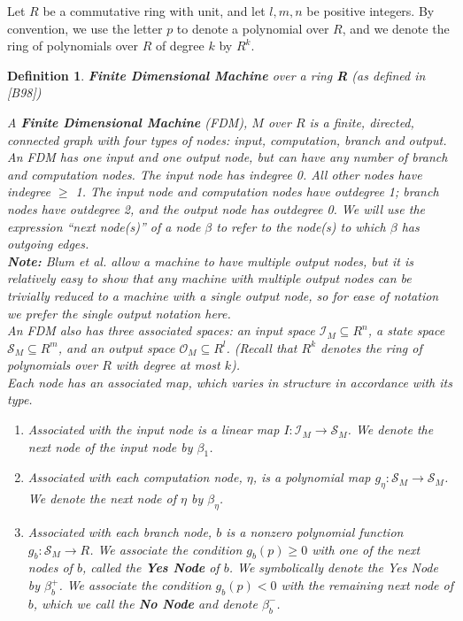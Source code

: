 \documentclass[twoside]{article}
\newcommand{\functype}[3]{$#1:#2 \rightarrow #3$}
\newcommand{\inspace}[0]{\mathcal{I}}
\newcommand{\outspace}[0]{\mathcal{O}}
\newcommand{\statespace}[0]{\mathcal{S}}
\newcommand{\note}[1]{{\textbf{Note:} #1}}
\renewcommand{\cite}[1]{[#1]}
\newtheorem{definition}{Definition}[section]
\begin{document}
Let $R$ be a commutative ring with unit, and let $l, m, n$ be positive
integers.  By convention, we use the letter $p$ to denote a polynomial
over $R$, and we denote the ring of polynomials over $R$ of degree $k$
by $R^k$. 

\begin{definition}{\textbf{Finite Dimensional Machine} over a ring
    \textbf{R} (as defined in \cite{B98})}
  
  A \textbf{Finite Dimensional Machine} (FDM), $M$ over $R$ is a
  finite, directed, connected graph with four types of nodes:
  \emph{input, computation, branch} and \emph{output}.  An FDM has one
  input and one output node, but can have any number of branch and
  computation nodes. The input node has indegree 0.  All other nodes
  have indegree $\geq$ 1. The input node and computation nodes have
  outdegree 1; branch nodes have outdegree 2, and the output node has
  outdegree 0.  We will use the expression ``next node(s)'' of a node
  $\beta$ to refer to the node(s) to which $\beta$ has outgoing edges.\\
  
  \emph{\note{Blum et al. allow a machine to have multiple
      output nodes, but it is relatively easy to show that any machine
      with multiple output nodes can be trivially reduced to a machine
      with a single output node, so for ease of notation we
      prefer the single output notation here.}}\\
  
  An FDM also has three associated spaces: an input space $\inspace_M
  \subseteq R^n$, a state space $\statespace_M \subseteq R^m$, and an
  output space $\outspace_M \subseteq R^l$.  (Recall that $R^k$
  denotes the ring of polynomials over $R$ with degree at most $k$).\\
  
  Each node has an associated map, which varies in structure in
  accordance with its type.
  \begin{enumerate}
  \item Associated with the input node is a linear map
    \functype{I}{\inspace_M}{\statespace_M}. We denote the next node
    of the input node by $\beta_1$.
    
  \item Associated with each computation node, $\eta$, is a polynomial
    map \functype{g_\eta}{\statespace_M}{\statespace_M}. We denote the
    next node of $\eta$ by $\beta_\eta$.
    
  \item Associated with each branch node, $b$ is a nonzero polynomial
    function \functype{g_b}{\statespace_M}{R}.  We associate the
    condition $g_b(p) \geq 0$ with one of the next nodes of $b$,
    called the \textbf{Yes Node} of $b$.  We symbolically denote the
    Yes Node by $\beta_b^+$. We associate the condition $g_b(p) < 0$
    with the remaining next node of $b$, which we call the \textbf{No
      Node} and denote $\beta_b^-$.
    

\end{enumerate}
\end{definition}
\end{document}
